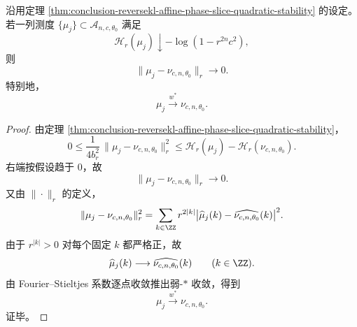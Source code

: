 \begin{corollary}\label{cor:conclusion-reversekl-affine-phase-slice-strong-convergence}
沿用定理 \ref{thm:conclusion-reversekl-affine-phase-slice-quadratic-stability} 的设定。
若一列测度 \(\{\mu_j\}\subset \mathcal A_{n,c,\theta_0}\) 满足
\[
\mathcal H_r(\mu_j)\downarrow -\log(1-r^{2n}c^2),
\]
则
\[
\|\mu_j-\nu_{c,n,\theta_0}\|_r\longrightarrow 0.
\]
特别地，
\[
\mu_j\stackrel{w^\ast}{\longrightarrow}\nu_{c,n,\theta_0}.
\]
\end{corollary}
\begin{proof}
由定理 \ref{thm:conclusion-reversekl-affine-phase-slice-quadratic-stability}，
\[
0\le \frac{1}{4b_r^2}\,\|\mu_j-\nu_{c,n,\theta_0}\|_r^2
\le
\mathcal H_r(\mu_j)-\mathcal H_r(\nu_{c,n,\theta_0}).
\]
右端按假设趋于 \(0\)，故
\[
\|\mu_j-\nu_{c,n,\theta_0}\|_r\to 0.
\]
又由 \(\|\cdot\|_r\) 的定义，
\[
\|\mu_j-\nu_{c,n,\theta_0}\|_r^2
=
\sum_{k\in\ZZ}r^{2|k|}\bigl|\widehat\mu_j(k)-\widehat{\nu_{c,n,\theta_0}}(k)\bigr|^2.
\]
由于 \(r^{|k|}>0\) 对每个固定 \(k\) 都严格正，故
\[
\widehat\mu_j(k)\longrightarrow \widehat{\nu_{c,n,\theta_0}}(k)
\qquad (k\in\ZZ).
\]
由 Fourier--Stieltjes 系数逐点收敛推出弱-\(*\) 收敛，得到
\[
\mu_j\stackrel{w^\ast}{\longrightarrow}\nu_{c,n,\theta_0}.
\]
证毕。
\end{proof}
